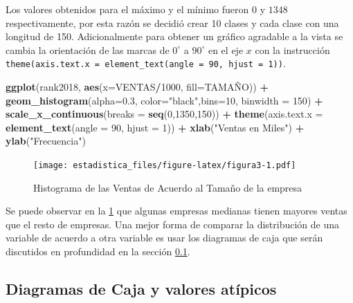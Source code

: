 \documentclass[]{book}
\newenvironment{Shaded}{\begin{snugshade}}{\end{snugshade}}
\newcommand{\KeywordTok}[1]{\textcolor[rgb]{0.13,0.29,0.53}{\textbf{#1}}}
\newcommand{\DataTypeTok}[1]{\textcolor[rgb]{0.13,0.29,0.53}{#1}}
\newcommand{\DecValTok}[1]{\textcolor[rgb]{0.00,0.00,0.81}{#1}}
\newcommand{\FloatTok}[1]{\textcolor[rgb]{0.00,0.00,0.81}{#1}}
\newcommand{\StringTok}[1]{\textcolor[rgb]{0.31,0.60,0.02}{#1}}
\newcommand{\OperatorTok}[1]{\textcolor[rgb]{0.81,0.36,0.00}{\textbf{#1}}}
\newcommand{\NormalTok}[1]{#1}
\begin{document}
Los valores obtenidos para el máximo y el mínimo fueron \(0\) y \(1348\)
respectivamente, por esta razón se decidió crear 10 clases y cada clase
con una longitud de 150. Adicionalmente para obtener un gráfico
agradable a la vista se cambia la orientación de las marcas de
\(0^\circ\) a \(90^\circ\) en el eje \(x\) con la instrucción
\texttt{theme(axis.text.x\ =\ element\_text(angle\ =\ 90,\ hjust\ =\ 1))}.

\begin{Shaded}
\begin{Highlighting}[]
\KeywordTok{ggplot}\NormalTok{(rank2018, }\KeywordTok{aes}\NormalTok{(}\DataTypeTok{x=}\NormalTok{VENTAS}\OperatorTok{/}\DecValTok{1000}\NormalTok{, }\DataTypeTok{fill=}\NormalTok{TAMAÑO)) }\OperatorTok{+}\StringTok{ }
\StringTok{  }\KeywordTok{geom_histogram}\NormalTok{(}\DataTypeTok{alpha=}\FloatTok{0.3}\NormalTok{, }\DataTypeTok{color=}\StringTok{"black"}\NormalTok{,}\DataTypeTok{bins=}\DecValTok{10}\NormalTok{, }\DataTypeTok{binwidth =} \DecValTok{150}\NormalTok{) }\OperatorTok{+}
\StringTok{  }\KeywordTok{scale_x_continuous}\NormalTok{(}\DataTypeTok{breaks =} \KeywordTok{seq}\NormalTok{(}\DecValTok{0}\NormalTok{,}\DecValTok{1350}\NormalTok{,}\DecValTok{150}\NormalTok{)) }\OperatorTok{+}
\StringTok{  }\KeywordTok{theme}\NormalTok{(}\DataTypeTok{axis.text.x =} \KeywordTok{element_text}\NormalTok{(}\DataTypeTok{angle =} \DecValTok{90}\NormalTok{, }\DataTypeTok{hjust =} \DecValTok{1}\NormalTok{)) }\OperatorTok{+}
\StringTok{  }\KeywordTok{xlab}\NormalTok{(}\StringTok{"Ventas en Miles"}\NormalTok{) }\OperatorTok{+}\StringTok{ }\KeywordTok{ylab}\NormalTok{(}\StringTok{"Frecuencia"}\NormalTok{) }
\end{Highlighting}
\end{Shaded}

\begin{figure}
\centering
\texttt{[image: estadistica\_files/figure-latex/figura3-1.pdf]}
\caption{\label{fig:figura3}Histograma de las Ventas de Acuerdo al Tamaño de
la empresa}
\end{figure}

Se puede observar en la \ref{fig:figura3} que algunas empresas medianas
tienen mayores ventas que el resto de empresas. Una mejor forma de
comparar la distribución de una variable de acuerdo a otra variable es
usar los diagramas de caja que serán discutidos en profundidad en la
sección \ref{boxes}.

\subsection{Diagramas de Caja y valores atípicos}\label{boxes}
\end{document}
